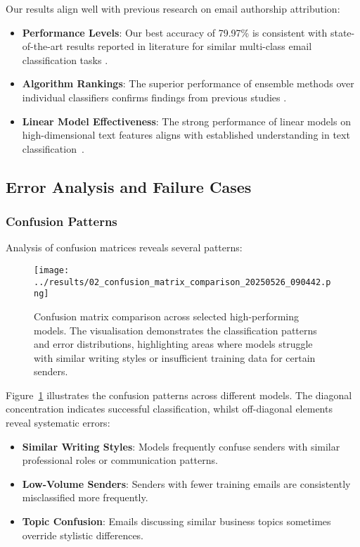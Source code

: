 \documentclass[11pt,a4paper]{article}
\begin{document}
Our results align well with previous research on email authorship attribution:

\begin{itemize}
    \item \textbf{Performance Levels}: Our best accuracy of 79.97\% is consistent with state-of-the-art results reported in literature for similar multi-class email classification tasks \cite{iqbal2013forensic}.
    
    \item \textbf{Algorithm Rankings}: The superior performance of ensemble methods over individual classifiers confirms findings from previous studies \cite{stamatatos2009survey}.
    
    \item \textbf{Linear Model Effectiveness}: The strong performance of linear models on high-dimensional text features aligns with established understanding in text classification~\cite{sebastiani2002machine}.
\end{itemize}

\subsection{Error Analysis and Failure Cases}

\subsubsection{Confusion Patterns}

Analysis of confusion matrices reveals several patterns:

\begin{figure}[H]
    \centering
    \texttt{[image: ../results/02\_confusion\_matrix\_comparison\_20250526\_090442.png]}
    \caption{Confusion matrix comparison across selected high-performing models. The visualisation demonstrates the classification patterns and error distributions, highlighting areas where models struggle with similar writing styles or insufficient training data for certain senders.}
    \label{fig:confusion_matrices}
\end{figure}

Figure~\ref{fig:confusion_matrices} illustrates the confusion patterns across different models. The diagonal concentration indicates successful classification, whilst off-diagonal elements reveal systematic errors:

\begin{itemize}
    \item \textbf{Similar Writing Styles}: Models frequently confuse senders with similar professional roles or communication patterns.
    
    \item \textbf{Low-Volume Senders}: Senders with fewer training emails are consistently misclassified more frequently.
    
    \item \textbf{Topic Confusion}: Emails discussing similar business topics sometimes override stylistic differences.
\end{itemize}
\end{document}
